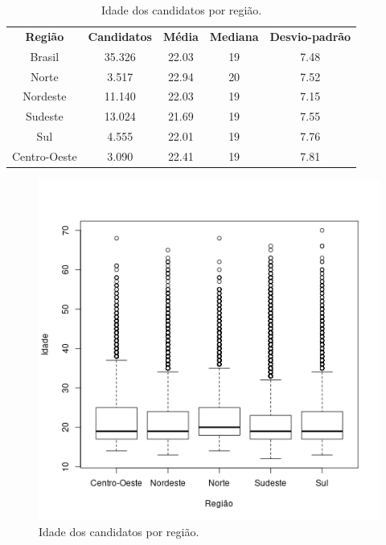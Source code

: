 \documentclass[12pt]{article}
\begin{document}
\begin{minipage}{.5\textwidth}
    \begin{table}[H]
    \begin{tabular}{ c c c c c }
      \textbf{Região}  & \textbf{Candidatos} & \textbf{Média} & \textbf{Mediana} & \textbf{Desvio-padrão} \\
      Brasil           & 35.326              & 22.03          & 19               & 7.48 \\
      Norte            & 3.517               & 22.94          & 20               & 7.52 \\
      Nordeste         & 11.140              & 22.03          & 19               & 7.15 \\
      Sudeste          & 13.024              & 21.69          & 19               & 7.55 \\
      Sul              & 4.555               & 22.01          & 19               & 7.76 \\
      Centro-Oeste     & 3.090               & 22.41          & 19               & 7.81 \\
    \end{tabular}
    \caption{Idade dos candidatos por região.}
    \label{tab:idade-por-regiao}
    \end{table}
\end{minipage}%
\begin{minipage}{.5\textwidth}
    \begin{figure}[H]
    \includegraphics[width=\linewidth]{../regiao_idade.png}
    \caption{Idade dos candidatos por região.}
    \label{fig:idade-por-regiao}
    \end{figure}
\end{minipage}
\end{document}
